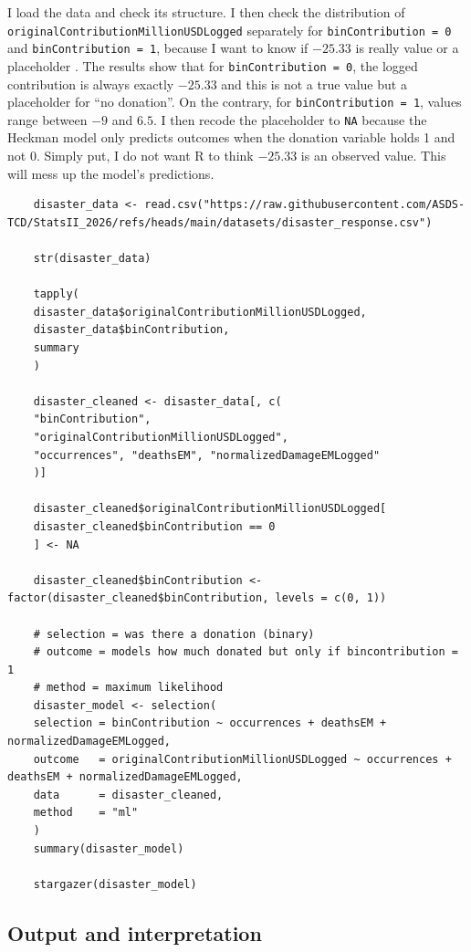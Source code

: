 \documentclass[12pt,letterpaper]{article}
\begin{document}
\noindent I load the data and check its structure. I then check the distribution of \texttt{originalContributionMillionUSDLogged} separately for \texttt{binContribution = 0} and \texttt{binContribution = 1}, because I want to know if $-25.33$ is really  value or a placeholder . The results show that for \texttt{binContribution = 0}, the logged contribution is always exactly $-25.33$ and this is not a true value but a placeholder for ``no donation''. On the contrary, for \texttt{binContribution = 1}, values range between $-9$ and $6.5$. I then recode the placeholder to \texttt{NA} because the Heckman model only predicts outcomes when the donation variable holds 1 and not 0. Simply put, I do not want R to think $-25.33$ is an observed value. This will mess up the model's predictions.\newline

\tiny \begin{BVerbatim}
	disaster_data <- read.csv("https://raw.githubusercontent.com/ASDS-TCD/StatsII_2026/refs/heads/main/datasets/disaster_response.csv")
	
	str(disaster_data)
	
	tapply(
	disaster_data$originalContributionMillionUSDLogged,
	disaster_data$binContribution,
	summary
	)
	
	disaster_cleaned <- disaster_data[, c(
	"binContribution",
	"originalContributionMillionUSDLogged",
	"occurrences", "deathsEM", "normalizedDamageEMLogged"
	)]
	
	disaster_cleaned$originalContributionMillionUSDLogged[
	disaster_cleaned$binContribution == 0
	] <- NA
	
	disaster_cleaned$binContribution <- factor(disaster_cleaned$binContribution, levels = c(0, 1))
	
	# selection = was there a donation (binary)
	# outcome = models how much donated but only if bincontribution = 1
	# method = maximum likelihood
	disaster_model <- selection(
	selection = binContribution ~ occurrences + deathsEM + normalizedDamageEMLogged,
	outcome   = originalContributionMillionUSDLogged ~ occurrences + deathsEM + normalizedDamageEMLogged,
	data      = disaster_cleaned,
	method    = "ml"
	)
	summary(disaster_model)
	
	stargazer(disaster_model)
\end{BVerbatim}
\normalsize \newline

\subsection{Output and interpretation}
\end{document}
